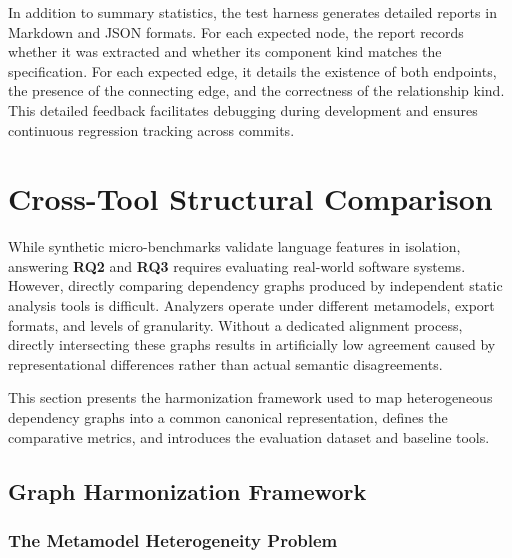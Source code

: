 In addition to summary statistics, the test harness generates
detailed reports in Markdown and JSON formats. For each expected
node, the report records whether it was extracted and whether its
component kind matches the specification. For each expected edge, it
details the existence of both endpoints, the presence of the
connecting edge, and the correctness of the relationship kind. This
detailed feedback facilitates debugging during development and
ensures continuous regression tracking across commits.

\section{Cross-Tool Structural Comparison}
\label{sec:cross_tool_comparison}

While synthetic micro-benchmarks validate language features in
isolation, answering \textbf{RQ2} and \textbf{RQ3} requires evaluating
real-world software systems. However, directly comparing dependency
graphs produced by independent static analysis tools is difficult.
Analyzers operate under different metamodels, export formats, and
levels of granularity. Without a dedicated alignment process,
directly intersecting these graphs results in artificially low
agreement caused by representational differences rather than actual
semantic disagreements.

This section presents the harmonization framework used to map
heterogeneous dependency graphs into a common canonical
representation, defines the comparative metrics, and introduces the
evaluation dataset and baseline tools.

\subsection{Graph Harmonization Framework}
\label{subsec:graph_harmonization}
\label{sec:graph_harmonization_framework}

\subsubsection{The Metamodel Heterogeneity Problem}
\label{subsec:metamodel_heterogeneity}

